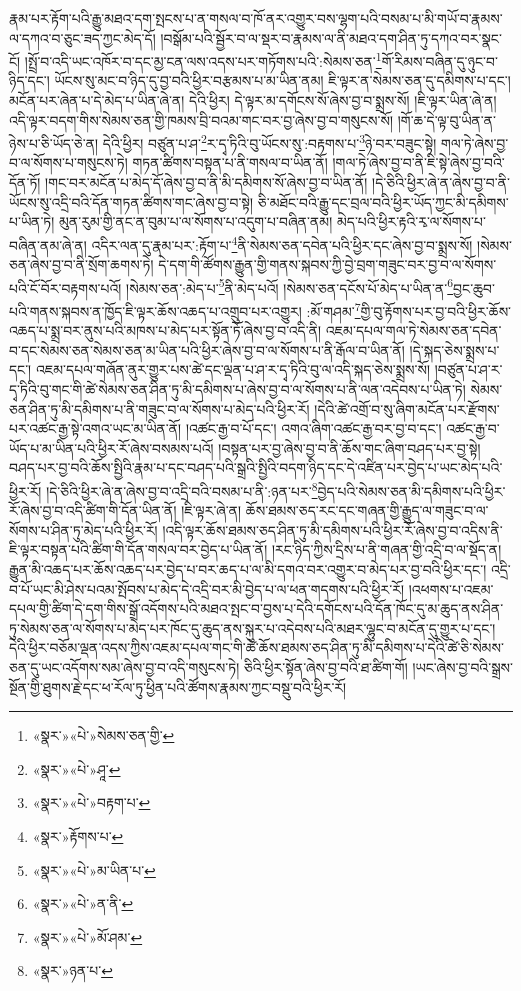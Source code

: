 རྣམ་པར་རྟོག་པའི་རྒྱུ་མཐའ་དག་སྤངས་པ་ན་གསལ་བ་ཁོ་ནར་འགྱུར་བས་ལྷག་པའི་བསམ་པ་མི་གཡོ་བ་རྣམས་ལ་དཀའ་བ་ཅུང་ཟད་ཀྱང་མེད་དོ། །བསྒོམ་པའི་སྦྱོར་བ་ལ་སྡར་བ་རྣམས་ལ་ནི་མཐའ་དག་ཤིན་ཏུ་དཀའ་བར་སྣང་ངོ། །སྤྲོ་བ་འདི་ཡང་འཁོར་བ་དང་མྱ་ངན་ལས་འདས་པར་གཏོགས་པའི་:སེམས་ཅན་\footnote{«སྣར་»«པེ་»སེམས་ཅན་གྱི་}གོ་རིམས་བཞིན་དུ་ཉུང་བ་ཉིད་དང་། ཡོངས་སུ་མང་བ་ཉིད་དུ་བྱ་བའི་ཕྱིར་བརྩམས་པ་མ་ཡིན་ནམ། ཇི་ལྟར་ན་སེམས་ཅན་དུ་དམིགས་པ་དང་། མངོན་པར་ཞེན་པ་དེ་མེད་པ་ཡིན་ཞེ་ན། དེའི་ཕྱིར། དེ་ལྟར་མ་དགོངས་སོ་ཞེས་བྱ་བ་སྨྲས་སོ། །ཇི་ལྟར་ཡིན་ཞེ་ན། འདི་ལྟར་བདག་གིས་སེམས་ཅན་གྱི་ཁམས་བྲི་བའམ་གང་བར་བྱ་ཞེས་བྱ་བ་གསུངས་སོ། །གོ་ཆ་དེ་ལྟ་བུ་ཡིན་ན་ཉེས་པ་ཅི་ཡོད་ཅེ་ན། དེའི་ཕྱིར། བཙུན་པ་ཤ་\footnote{«སྣར་»«པེ་»ཤཱ་}ར་དྭ་ཏིའི་བུ་ཡོངས་སུ་:བརྟགས་པ་\footnote{«སྣར་»«པེ་»བརྟག་པ་}ཉེ་བར་བཟུང་སྟེ། གལ་ཏེ་ཞེས་བྱ་བ་ལ་སོགས་པ་གསུངས་ཏེ། གཏན་ཚིགས་བསྟན་པ་ནི་གསལ་བ་ཡིན་ནོ། །གལ་ཏེ་ཞེས་བྱ་བ་ནི་ཇི་སྟེ་ཞེས་བྱ་བའི་དོན་ཏོ། །གང་བར་མངོན་པ་མེད་དོ་ཞེས་བྱ་བ་ནི་མི་དམིགས་སོ་ཞེས་བྱ་བ་ཡིན་ནོ། །དེ་ཅིའི་ཕྱིར་ཞེ་ན་ཞེས་བྱ་བ་ནི་ཡོངས་སུ་འདྲི་བའི་དོན་གཏན་ཚིགས་གང་ཞེས་བྱ་བ་སྟེ། ཅི་མཐོང་བའི་རྒྱུ་དང་བྲལ་བའི་ཕྱིར་ཡོད་ཀྱང་མི་དམིགས་པ་ཡིན་ཏེ། མུན་རུམ་གྱི་ནང་ན་བུམ་པ་ལ་སོགས་པ་འདུག་པ་བཞིན་ནམ། མེད་པའི་ཕྱིར་རྟའི་རྭ་ལ་སོགས་པ་བཞིན་ནམ་ཞེ་ན། འདིར་ལན་དུ་རྣམ་པར་:རྟོག་པ་\footnote{«སྣར་»རྟོགས་པ་}ནི་སེམས་ཅན་དབེན་པའི་ཕྱིར་དང་ཞེས་བྱ་བ་སྨྲས་སོ། །སེམས་ཅན་ཞེས་བྱ་བ་ནི་སྲོག་ཆགས་ཏེ། དེ་དག་གི་ཚོགས་རྒྱུན་གྱི་གནས་སྐབས་ཀྱི་བྱེ་བྲག་གཟུང་བར་བྱ་བ་ལ་སོགས་པའི་ངོ་བོར་བརྟགས་པའོ། །སེམས་ཅན་:མེད་པ་\footnote{«སྣར་»«པེ་»མ་ཡིན་པ་}ནི་མེད་པའོ། །སེམས་ཅན་དངོས་པོ་མེད་པ་ཡིན་ན་\footnote{«སྣར་»«པེ་»ན་ནི་}བྱང་ཆུབ་པའི་གནས་སྐབས་ན་ཁྱོད་ཇི་ལྟར་ཆོས་འཆད་པ་འགྲུབ་པར་འགྱུར། :མོ་གཤམ་\footnote{«སྣར་»«པེ་»མོ་ཤམ་}གྱི་བུ་རྟོགས་པར་བྱ་བའི་ཕྱིར་ཆོས་འཆད་པ་སྨྲ་བར་ནུས་པའི་མཁས་པ་མེད་པར་སྟོན་ཏོ་ཞེས་བྱ་བ་འདི་ནི། འཇམ་དཔལ་གལ་ཏེ་སེམས་ཅན་དབེན་བ་དང་སེམས་ཅན་སེམས་ཅན་མ་ཡིན་པའི་ཕྱིར་ཞེས་བྱ་བ་ལ་སོགས་པ་ནི་རྒོལ་བ་ཡིན་ནོ། །དེ་སྐད་ཅེས་སྨྲས་པ་དང་། འཇམ་དཔལ་གཞོན་ནུར་གྱུར་པས་ཚེ་དང་ལྡན་པ་ཤ་ར་དྭ་ཏིའི་བུ་ལ་འདི་སྐད་ཅེས་སྨྲས་སོ། །བཙུན་པ་ཤ་ར་དྭ་ཏིའི་བུ་གང་གི་ཚེ་སེམས་ཅན་ཤིན་ཏུ་མི་དམིགས་པ་ཞེས་བྱ་བ་ལ་སོགས་པ་ནི་ལན་འདེབས་པ་ཡིན་ཏེ། སེམས་ཅན་ཤིན་ཏུ་མི་དམིགས་པ་ནི་གཟུང་བ་ལ་སོགས་པ་མེད་པའི་ཕྱིར་རོ། །དེའི་ཚེ་འགྲོ་བ་སུ་ཞིག་མངོན་པར་རྫོགས་པར་འཚང་རྒྱ་སྟེ་འགའ་ཡང་མ་ཡིན་ནོ། །འཚང་རྒྱ་བ་པོ་དང་། འགའ་ཞིག་འཚང་རྒྱ་བར་བྱ་བ་དང་། འཚང་རྒྱ་བ་ཡོད་པ་མ་ཡིན་པའི་ཕྱིར་རོ་ཞེས་བསམས་པའོ། །བསྟན་པར་བྱ་ཞེས་བྱ་བ་ནི་ཆོས་གང་ཞིག་བཤད་པར་བྱ་སྟེ། བཤད་པར་བྱ་བའི་ཆོས་སྤྱིའི་རྣམ་པ་དང་བཤད་པའི་སྒྲའི་སྤྱིའི་བདག་ཉིད་དང་དེ་འཛིན་པར་བྱེད་པ་ཡང་མེད་པའི་ཕྱིར་རོ། །དེ་ཅིའི་ཕྱིར་ཞེ་ན་ཞེས་བྱ་བ་འདྲི་བའི་བསམ་པ་ནི་:ཉན་པར་\footnote{«སྣར་»ཉན་པ་}བྱེད་པའི་སེམས་ཅན་མི་དམིགས་པའི་ཕྱིར་རོ་ཞེས་བྱ་བ་འདི་ཚིག་གི་དོན་ཡིན་ནོ། །ཇི་ལྟར་ཞེ་ན། ཆོས་ཐམས་ཅད་རང་དང་གཞན་གྱི་རྒྱུད་ལ་གཟུང་བ་ལ་སོགས་པ་ཤིན་ཏུ་མེད་པའི་ཕྱིར་རོ། །འདི་ལྟར་ཆོས་ཐམས་ཅད་ཤིན་ཏུ་མི་དམིགས་པའི་ཕྱིར་རོ་ཞེས་བྱ་བ་འདིས་ནི་ཇི་ལྟར་བསྟན་པའི་ཚིག་གི་དོན་གསལ་བར་བྱེད་པ་ཡིན་ནོ། །རང་ཉིད་ཀྱིས་དྲིས་པ་ནི་གཞན་གྱི་འདྲི་བ་ལ་སྡོད་ན། རྒྱུན་མི་འཆད་པར་ཆོས་འཆད་པར་བྱེད་པ་བར་ཆད་པ་ལ་མི་དགའ་བར་འགྱུར་བ་མེད་པར་བྱ་བའི་ཕྱིར་དང་། འདྲི་བ་པོ་ཡང་མི་ཤེས་པའམ་སྤོབས་པ་མེད་དེ་འདྲི་བར་མི་བྱེད་པ་ལ་ཕན་གདགས་པའི་ཕྱིར་རོ། །འཕགས་པ་འཇམ་དཔལ་གྱི་ཚིག་དེ་དག་གིས་སྒྲོ་འདོགས་པའི་མཐའ་སྤང་བ་བྱས་པ་དེའི་དགོངས་པའི་དོན་ཁོང་དུ་མ་ཆུད་ནས་ཤིན་ཏུ་སེམས་ཅན་ལ་སོགས་པ་མེད་པར་ཁོང་དུ་ཆུད་ནས་སྐུར་པ་འདེབས་པའི་མཐར་ལྷུང་བ་མངོན་དུ་གྱུར་པ་དང་། དེའི་ཕྱིར་བཅོམ་ལྡན་འདས་ཀྱིས་འཇམ་དཔལ་གང་གི་ཚེ་ཆོས་ཐམས་ཅད་ཤིན་ཏུ་མི་དམིགས་པ་དེའི་ཚེ་ཅི་སེམས་ཅན་དུ་ཡང་འདོགས་སམ་ཞེས་བྱ་བ་འདི་གསུངས་ཏེ། ཅིའི་ཕྱིར་སྟོན་ཞེས་བྱ་བའི་ཐ་ཚིག་གོ། །ཡང་ཞེས་བྱ་བའི་སྒྲས་སྔོན་གྱི་ཐུགས་རྗེ་དང་ཕ་རོལ་ཏུ་ཕྱིན་པའི་ཚོགས་རྣམས་ཀྱང་བསྡུ་བའི་ཕྱིར་རོ། 